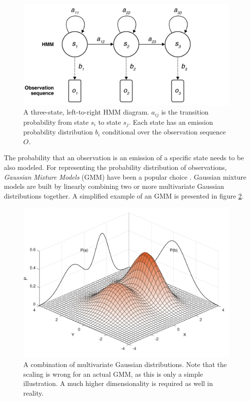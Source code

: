 \documentclass[english, 12pt, a4paper, pdftex, elec, utf8]{aaltothesis}
\begin{document}
\begin{figure}[h!]
	\centering
	\includegraphics[width=\textwidth]{hmm.pdf}
	\caption{A three-state, left-to-right HMM diagram. $a_{ij}$ is the transition probability from state $s_i$ to state $s_j$. Each state has an emission probability distribution $b_i$ conditional over the observation sequence $O$.}
	\label{fig:hmm} 
\end{figure}
The probability that an observation is an emission of a specific state needs to be also modeled. For representing the probability distribution of observations, \textit{Gaussian Mixture Models} (GMM) have been a popular choice \cite{gales2008application, hinton2012deep}. Gaussian mixture models are built by linearly combining two or more multivariate Gaussian distributions together. A simplified example of an GMM is presented in figure \ref{fig:gmm}.
\begin{figure}[b]
	\centering
	\includegraphics[trim={0cm 0.2cm 0cm 0.2cm}, clip, width=\textwidth]{gmm.pdf}
	\caption{A combination of multivariate Gaussian distributions. Note that the scaling is wrong for an actual GMM, as this is only a simple illustration. A much higher dimensionality is required as well in reality.}
	\label{fig:gmm} 
\end{figure} \\\\
\end{document}
